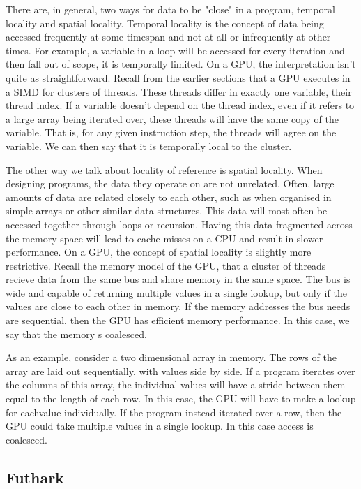 \documentclass{article}
\begin{document}
There are, in general, two ways for data to be "close" in a program, temporal locality and spatial locality. Temporal locality is the concept of data being
accessed frequently at some timespan and not at all or infrequently at other times. For example, a variable in a loop will be accessed for every iteration and
then fall out of scope, it is temporally limited. On a GPU, the interpretation isn't quite as straightforward. Recall from the earlier sections that a GPU
executes in a SIMD for clusters of threads. These threads differ in exactly one variable, their thread index. If a variable doesn't depend on the thread index,
even if it refers to a large array being iterated over, these threads will have the same copy of the variable. That is, for any given instruction step, the
threads will agree on the variable. We can then say that it is temporally local to the cluster.

The other way we talk about locality of reference is spatial locality. When designing programs, the data they operate on are not unrelated. Often, large amounts
of data are related closely to each other, such as when organised in simple arrays or other similar data structures. This data will most often be accessed
together through loops or recursion. Having this data fragmented across the memory space will lead to cache misses on a CPU and result in slower performance. On
a GPU, the concept of spatial locality is slightly more restrictive. Recall the memory model of the GPU, that a cluster of threads recieve data from the same
bus and share memory in the same space. The bus is wide and capable of returning multiple values in a single lookup, but only if the values are close to each
other in memory. If the memory addresses the bus needs are sequential, then the GPU has efficient memory performance. In this case, we say that the memory s
coalesced.

As an example, consider a two dimensional array in memory. The rows of the array are laid out sequentially, with values side by side. If a program iterates over
the columns of this array, the individual values will have a stride between them equal to the length of each row. In this case, the GPU will have to make a
lookup for eachvalue individually. If the program instead iterated over a row, then the GPU could take multiple values in a single lookup. In this case access
is coalesced.

\subsection{Futhark}
\end{document}
